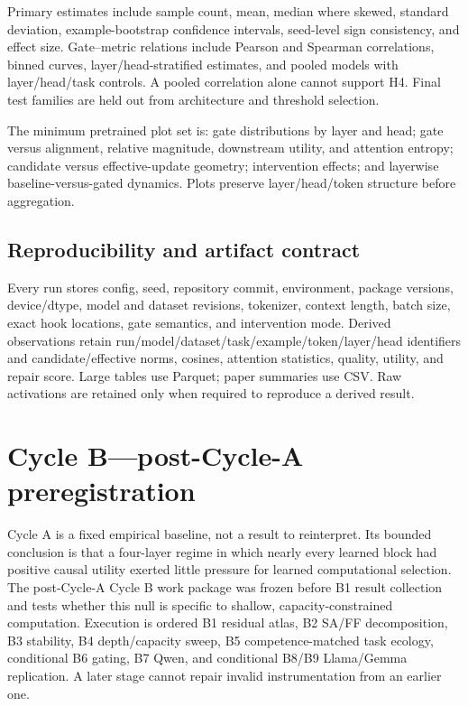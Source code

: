 \documentclass[10pt]{article}
\begin{document}
Primary estimates include sample count, mean, median where skewed, standard deviation, example-bootstrap confidence intervals, seed-level sign consistency, and effect size. Gate--metric relations include Pearson and Spearman correlations, binned curves, layer/head-stratified estimates, and pooled models with layer/head/task controls. A pooled correlation alone cannot support H4. Final test families are held out from architecture and threshold selection.

The minimum pretrained plot set is: gate distributions by layer and head; gate versus alignment, relative magnitude, downstream utility, and attention entropy; candidate versus effective-update geometry; intervention effects; and layerwise baseline-versus-gated dynamics. Plots preserve layer/head/token structure before aggregation.

\subsection{Reproducibility and artifact contract}
Every run stores config, seed, repository commit, environment, package versions, device/dtype, model and dataset revisions, tokenizer, context length, batch size, exact hook locations, gate semantics, and intervention mode. Derived observations retain run/model/dataset/task/example/token/layer/head identifiers and candidate/effective norms, cosines, attention statistics, quality, utility, and repair score. Large tables use Parquet; paper summaries use CSV. Raw activations are retained only when required to reproduce a derived result.

\section{Cycle B---post-Cycle-A preregistration}
Cycle A is a fixed empirical baseline, not a result to reinterpret. Its bounded conclusion is that a four-layer regime in which nearly every learned block had positive causal utility exerted little pressure for learned computational selection. The post-Cycle-A Cycle B work package was frozen before B1 result collection and tests whether this null is specific to shallow, capacity-constrained computation. Execution is ordered B1 residual atlas, B2 SA/FF decomposition, B3 stability, B4 depth/capacity sweep, B5 competence-matched task ecology, conditional B6 gating, B7 Qwen, and conditional B8/B9 Llama/Gemma replication. A later stage cannot repair invalid instrumentation from an earlier one.
\end{document}
